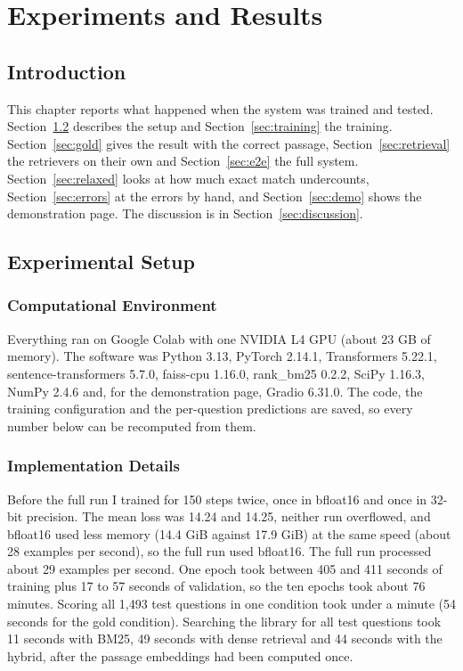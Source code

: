 \chapter{Experiments and Results}

\section{Introduction}

This chapter reports what happened when the system was trained and tested. Section~\ref{sec:setup} describes the setup and Section~\ref{sec:training} the training. Section~\ref{sec:gold} gives the result with the correct passage, Section~\ref{sec:retrieval} the retrievers on their own and Section~\ref{sec:e2e} the full system. Section~\ref{sec:relaxed} looks at how much exact match undercounts, Section~\ref{sec:errors} at the errors by hand, and Section~\ref{sec:demo} shows the demonstration page. The discussion is in Section~\ref{sec:discussion}.

\section{Experimental Setup}
\label{sec:setup}

\subsection{Computational Environment}

Everything ran on Google Colab with one NVIDIA L4 GPU (about 23 GB of memory). The software was Python 3.13, PyTorch 2.14.1, Transformers 5.22.1, sentence-transformers 5.7.0, faiss-cpu 1.16.0, rank\_bm25 0.2.2, SciPy 1.16.3, NumPy 2.4.6 and, for the demonstration page, Gradio 6.31.0. The code, the training configuration and the per-question predictions are saved, so every number below can be recomputed from them.

\subsection{Implementation Details}

Before the full run I trained for 150 steps twice, once in bfloat16 and once in 32-bit precision. The mean loss was 14.24 and 14.25, neither run overflowed, and bfloat16 used less memory (14.4 GiB against 17.9 GiB) at the same speed (about 28 examples per second), so the full run used bfloat16. The full run processed about 29 examples per second. One epoch took between 405 and 411 seconds of training plus 17 to 57 seconds of validation, so the ten epochs took about 76 minutes. Scoring all 1,493 test questions in one condition took under a minute (54 seconds for the gold condition). Searching the library for all test questions took 11 seconds with BM25, 49 seconds with dense retrieval and 44 seconds with the hybrid, after the passage embeddings had been computed once.

